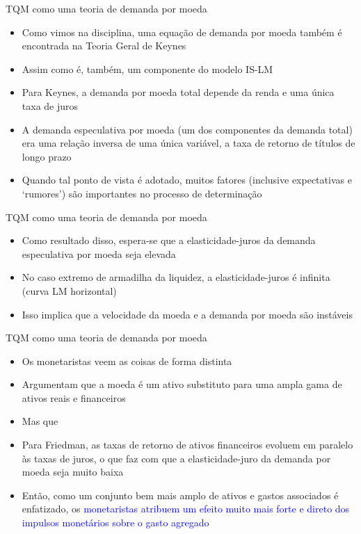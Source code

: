 \documentclass[10pt]{beamer}
\begin{document}
\begin{frame}{TQM como uma teoria de demanda por moeda}
    \begin{itemize}
        \item Como vimos na disciplina, uma equação de demanda por moeda também é encontrada na Teoria Geral de Keynes
        \bigskip
        \item Assim como é, também, um componente do modelo IS-LM
        \bigskip
        \item Para Keynes, a demanda por moeda total depende da renda e uma única taxa de juros
        \bigskip
        \item A demanda especulativa por moeda (um dos componentes da demanda total) era uma relação inversa de uma única variável, a taxa de retorno de títulos de longo prazo
        \bigskip
        \item Quando tal ponto de vista é adotado, muitos fatores (inclusive expectativas e `rumores') são importantes no processo de determinação
    \end{itemize}
\end{frame}

\begin{frame}{TQM como uma teoria de demanda por moeda}
    \begin{itemize}
        \item Como resultado disso, espera-se que a elasticidade-juros da demanda especulativa por moeda seja elevada
        \bigskip
        \item No caso extremo de armadilha da liquidez, a elasticidade-juros é infinita (curva LM horizontal)
        \bigskip
        \item Isso implica que a velocidade da moeda e a demanda por moeda são instáveis
    \end{itemize}
\end{frame}

\begin{frame}{TQM como uma teoria de demanda por moeda}
    \begin{itemize}
        \item Os monetaristas veem as coisas de forma distinta
        \bigskip
        \item Argumentam que a moeda é um ativo substituto para uma ampla gama de ativos reais e financeiros
        \bigskip
        \item Mas que 
        \bigskip
        \item Para Friedman, as taxas de retorno de ativos financeiros evoluem em paralelo às taxas de juros, o que faz com que a elasticidade-juro da demanda por moeda seja muito baixa
        \bigskip
        \item Então, como um conjunto bem mais amplo de ativos e gastos associados é enfatizado, os \textcolor{blue}{monetaristas atribuem um efeito muito mais forte e direto dos impulsos monetários sobre o gasto agregado}
    \end{itemize}
\end{frame}
\end{document}
